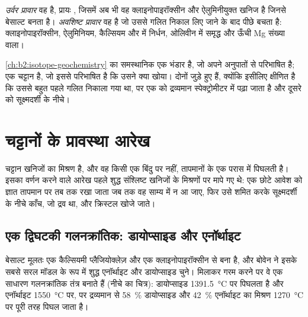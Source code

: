 \begin{definition}[उर्वर और अवशिष्ट प्रावार]\label{def:b2:mantle-melting:fertility}
\emph{उर्वर प्रावार} वह  है, प्रायः
, जिसमें अब भी वह क्लाइनोपाइरॉक्सीन और ऐलुमिनीयुक्त खनिज है जिनसे
बेसाल्ट बनता है। \emph{अवशिष्ट प्रावार} वह
 है जो उससे गलित निकाल लिए जाने के बाद पीछे बचता है:
क्लाइनोपाइरॉक्सीन, ऐलुमिनियम, कैल्सियम और  में निर्धन,
ओलिवीन में समृद्ध और ऊँची Mg संख्या वाला।
\end{definition}

\cref{ch:b2:isotope-geochemistry} का समस्थानिक  एक भंडार है,
जो अपने अनुपातों से परिभाषित है;  एक चट्टान है, जो इससे परिभाषित है कि उसने क्या खोया।
दोनों जुड़े हुए हैं, क्योंकि  इसीलिए क्षीणित है कि उससे बहुत पहले गलित
निकाला गया था, पर एक को द्रव्यमान स्पेक्ट्रोमीटर में पढ़ा जाता है और दूसरे को
सूक्ष्मदर्शी के नीचे।

\section{चट्टानों के प्रावस्था आरेख}\label{sec:b2:mantle-melting:diagrams}

चट्टान खनिजों का मिश्रण है, और वह किसी एक बिंदु पर नहीं, तापमानों के एक परास में
पिघलती है। इसका वर्णन करने वाले आरेख पहले शुद्ध संश्लिष्ट खनिजों के
मिश्रणों पर मापे गए थे: एक छोटे आवेश को ज्ञात तापमान पर तब तक रखा जाता जब तक वह
साम्य में न आ जाए, फिर उसे शमित करके सूक्ष्मदर्शी के नीचे काँच, जो
द्रव था, और क्रिस्टल खोजे जाते।

\subsection*{एक द्विघटकी गलनक्रांतिक: डायोप्साइड और एनॉर्थाइट}

बेसाल्ट मूलतः एक कैल्सियमी प्लैजियोक्लेज़ और एक क्लाइनोपाइरॉक्सीन से बना है, और
बोवेन ने इसके सबसे सरल मॉडल के रूप में शुद्ध एनॉर्थाइट और डायोप्साइड चुने। मिलाकर गरम करने पर
वे एक साधारण गलनक्रांतिक
तंत्र बनाते हैं (नीचे का चित्र): डायोप्साइड \qty{1391.5}{\celsius} पर पिघलता है और एनॉर्थाइट
\qty{1550}{\celsius} पर, पर द्रव्यमान से \qty{58}{\percent} डायोप्साइड और
\qty{42}{\percent} एनॉर्थाइट का मिश्रण \qty{1270}{\celsius} पर पूरी तरह पिघल जाता है।

